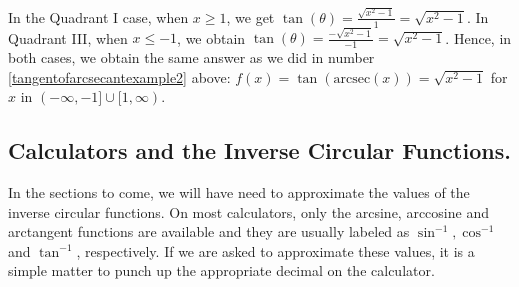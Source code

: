 \documentclass{ximera}
\begin{document}
\begin{image}
\end{image}
 

In the Quadrant I case, when $x \geq 1$, we get $\tan(\theta)  = \frac{\sqrt{x^2-1}}{1} = \sqrt{x^2-1}$.  In Quadrant III, when $x \leq -1$, we obtain  $\tan(\theta)  = \frac{-\sqrt{x^2-1}}{-1} = \sqrt{x^2-1}$.   Hence, in both cases, we obtain the same answer as we did in number \ref{tangentofarcsecantexample2} above:  $f(x)  = \tan(\text{arcsec}(x)) = \sqrt{x^2-1}$ for $x$ in $(-\infty, -1] \cup [1, \infty)$.

 



\subsection{Calculators and the Inverse Circular Functions.}
\label{sectionarcstuffoncalc}

In the sections to come, we will have need to approximate the values of the inverse circular functions.  On most calculators, only the arcsine, arccosine and arctangent functions are available and they are usually labeled as $\sin^{-1}, \cos^{-1}$ and $\tan^{-1}$, respectively.  If we are asked to approximate these values, it is a simple matter to punch up the appropriate decimal on the calculator. 
\end{document}
